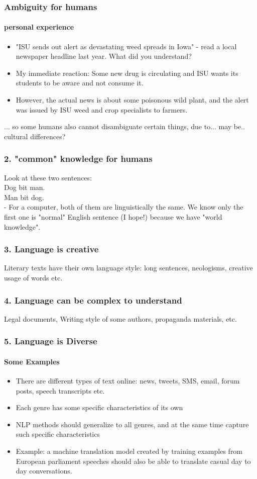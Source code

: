 \documentclass{beamer}
\begin{document}
\begin{frame}
\frametitle{Ambiguity for humans}
\framesubtitle{personal experience}
\begin{itemize}
\item "ISU sends out alert as devastating weed spreads in Iowa" - read a local newspaper headline last year. What did you understand?
\pause
\item My immediate reaction: Some new drug is circulating and ISU wants its students to be aware and not consume it. 
\pause
\item However, the actual news is about some poisonous wild plant, and the alert was issued by ISU weed and crop specialists to farmers.
\end{itemize}
... so some humans also cannot disambiguate certain things, due to... may be.. cultural differences?
\end{frame}

\begin{frame}
\frametitle{2. "common" knowledge for humans}
Look at these two sentences:
\\ Dog bit man.
\\ Man bit dog.
\\ - For a computer, both of them are linguistically the same. We know only the first one is "normal" English sentence (I hope!) because we have "world knowledge".
\end{frame}

\begin{frame}
\frametitle{3. Language is creative}
Literary texts have their own language style: long sentences, neologisms, creative usage of words etc.
\end{frame}

\begin{frame}
\frametitle{4. Language can be complex to understand}
Legal documents, Writing style of some authors, propaganda materials, etc.
\end{frame}

\begin{frame}
\frametitle{5. Language is Diverse}
\framesubtitle{Some Examples}
\begin{itemize}
\item There are different types of text online: news, tweets, SMS, email, forum posts, speech transcripts etc.
\item Each genre has some specific characteristics of its own
\item NLP methods should generalize to all genres, and at the same time capture such specific characteristics
\item Example: a machine translation model created by training examples from European parliament speeches should also be able to translate casual day to day conversations.
\end{itemize}
\end{frame}
\end{document}
